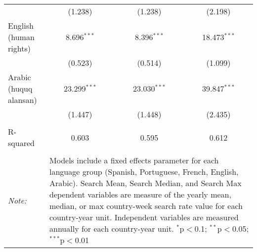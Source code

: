 \begin{table}[!htbp]
\begin{tabular}{@{\extracolsep{5pt}}lccc}
  & (1.238) & (1.238) & (2.198) \\ 
  English (human rights) & 8.696$^{***}$ & 8.396$^{***}$ & 18.473$^{***}$ \\ 
  & (0.523) & (0.514) & (1.099) \\ 
  Arabic (huquq alansan) & 23.299$^{***}$ & 23.030$^{***}$ & 39.847$^{***}$ \\ 
  & (1.447) & (1.448) & (2.435) \\ 
 \hline \\[-1.8ex] 
R-squared  & 0.603 & 0.595 & 0.612 \\ 
\hline 
\hline \\[-1.8ex] 
\textit{Note:}  & \multicolumn{3}{l}{\parbox[t]{8cm}{Models include a fixed effects parameter for each language group (Spanish, Portuguese, French, English, Arabic). Search Mean, Search Median, and Search Max dependent variables are measure of the yearly mean, median, or max country-week search rate value for each country-year unit. Independent variables are measured annually for each country-year unit. $^{*}$p$<$0.1; $^{**}$p$<$0.05; $^{***}$p$<$0.01}} \\ 
\end{tabular} 
\end{table} 
